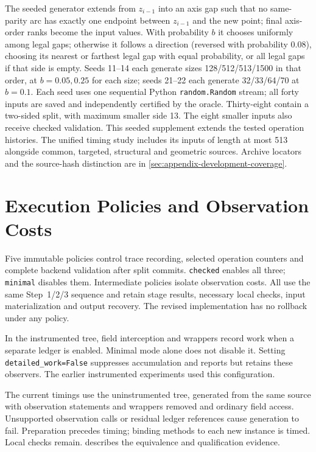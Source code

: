 The seeded generator extends from $z_{i-1}$ into an axis gap such that no
same-parity arc has exactly one endpoint between $z_{i-1}$ and the new
point; final axis-order ranks become the input values. With probability
$b$ it chooses uniformly among legal gaps; otherwise it follows a direction
(reversed with probability $0.08$), choosing its nearest or farthest legal
gap with equal probability, or all legal gaps if that side is empty.
Seeds 11--14 each generate sizes 128/512/513/1500 in that order, at
$b=0.05,0.25$ for each size; seeds 21--22 each generate 32/33/64/70 at
$b=0.1$. Each seed uses one sequential Python \texttt{random.Random}
stream; all forty inputs are saved and independently certified by the oracle.
Thirty-eight contain a two-sided split, with maximum smaller side 13.
The eight smaller inputs also receive checked validation.
This seeded supplement extends the tested operation histories. The unified
timing study includes its inputs of length at most 513 alongside common,
targeted, structural and geometric sources.
Archive locators and the source-hash distinction are in
\cref{sec:appendix-development-coverage}.

\section{Execution Policies and Observation Costs}
\label{sec:implementation-policies}

Five immutable policies control trace recording, selected operation counters
and complete backend validation after split commits. \texttt{checked}
enables all three; \texttt{minimal} disables them. Intermediate policies
isolate observation costs. All use the same Step~1/2/3 sequence and retain
stage results, necessary local checks, input materialization and output
recovery. The revised implementation has no rollback under any policy.

In the instrumented tree, field interception and wrappers record work when
a separate ledger is enabled. Minimal mode alone does not disable it.
Setting \texttt{detailed\_work=False} suppresses accumulation and reports but
retains these observers. The earlier instrumented experiments used this
configuration.

The current timings use the uninstrumented tree, generated from the same
source with observation statements and wrappers removed and ordinary field
access. Unsupported observation calls or residual ledger references cause
generation to fail. Preparation precedes timing; binding methods to each new
instance is timed. Local checks remain. 
describes the equivalence and qualification evidence.


